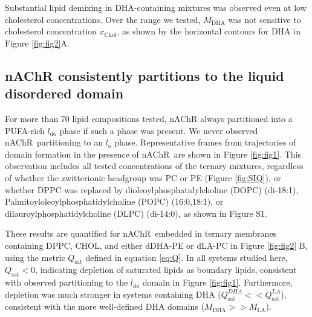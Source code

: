 \documentclass[final,3p,times,twocolumn]{elsarticle}
\newcommand{\qsat}{Q_{\mathrm{sat}}}
\newcommand{\xch}{x_{\mathrm{Chol}}}
\newcommand{\lo}{l_{\mathrm{o}}}
\newcommand{\ldo}{l_{\mathrm{do}}}
\newcommand{\mself}[1]{M_{\mathrm{#1}}}
\newcommand{\nachr}{nAChR}
\begin{document}
	Substantial lipid demixing in DHA-containing mixtures was observed even at low cholesterol concentrations. Over the range we tested, $\mself{DHA}$ was not sensitive to cholesterol concentration $\xch$, as shown by the horizontal contours for DHA in Figure \ref{fig:fig2}A.   

\subsection{nAChR consistently partitions to the liquid disordered domain} \label{PUFA}
	For more than 70 lipid compositions tested, nAChR always partitioned into a PUFA-rich $\ldo$ phase if such a phase was present. We never observed \nachr~partitioning to an $\lo$ phase. Representative frames from trajectories of domain formation in the presence of \nachr~are shown in Figure \ref{fig:fig1}.  This observation includes all tested concentrations of the ternary mixtures, regardless of whether the zwitterionic headgroup was PC or PE (Figure \ref{fig:SIQ}), or whether DPPC was replaced by dioleoylphosphatidylcholine (DOPC) (di-18:1), Palmitoyloleoylphosphatidylcholine (POPC) (16:0,18:1), or dilauroylphosphatidylcholine (DLPC) (di-14:0), as shown in Figure S1.   
	
	{These results are quantified for \nachr~embedded in ternary membranes containing DPPC, CHOL, and either dDHA-PE or dLA-PC in Figure \ref{fig:fig2} B, using the metric $\qsat$ defined in equation \ref{eq:Q}.}  
	In all systems studied here, $\qsat < 0$, indicating depletion of saturated lipids as boundary lipids, consistent with observed partitioning to the $\ldo$ domain in Figure \ref{fig:fig1}. Furthermore, depletion was much stronger in systems containing DHA ($\qsat^{DHA}<< \qsat^{LA}$), consistent with the more well-defined DHA domains ($\mself{DHA}>> \mself{LA}$). 
\end{document}
